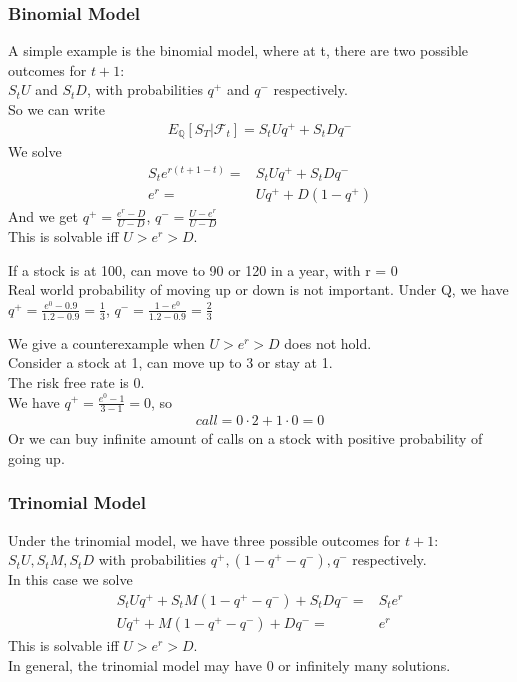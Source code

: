 \subsubsection{Binomial Model}
A simple example is the binomial model, where at t, there are two possible outcomes for $t+1$:\\
$S_t U$ and $S_t D$, with probabilities $q^+$ and $q^-$ respectively.\\
So we can write
\begin{align*}
    E_{\mathbb{Q}}[S_T | \mathcal{F}_t] = S_t U q^+ + S_t D q^-
\end{align*}
We solve
\begin{align*}
    S_t e^{r(t+1-t)} =& S_t U q^+ + S_t D q^- \\
    e^{r} =& U q^+ + D (1-q^+) 
\end{align*}
And we get $ q^+ = \frac{e^r - D}{U - D}$, $ q^- = \frac{U - e^r}{U - D}$ \\
This is solvable iff $U > e^r > D$.\\
\begin{example}
    If a stock is at 100, can move to 90 or 120 in a year, with r = 0\\
    Real world probability of moving up or down is not important.
    Under Q, we have $q^+ = \frac{e^0 - 0.9}{1.2 - 0.9} = \frac{1}{3}$, 
    $q^- = \frac{1 - e^0}{1.2 - 0.9} = \frac{2}{3}$
\end{example}

\begin{example}
    We give a counterexample when $U > e^r > D$ does not hold.\\
    Consider a stock at 1, can move up to 3 or stay at 1.\\
    The risk free rate is 0.\\
    We have $q^+ = \frac{e^0 - 1}{3 - 1} = 0$, so 
    \begin{align*}
        call = 0 \cdot 2 + 1 \cdot 0 = 0
    \end{align*}
    Or we can buy infinite amount of calls on a stock with positive 
    probability of going up.
\end{example}

\subsubsection{Trinomial Model}
Under the trinomial model, we have three possible outcomes for $t+1$:\\
$S_t U, S_t M, S_t D$ with probabilities $q^+, (1 - q^+ - q^-), q^-$ respectively.\\
In this case we solve 
\begin{align*}
    S_t U q^+ + S_t M (1 - q^+ - q^-) + S_t D q^- =&  S_t e^{r}\\
    U q^+ + M (1 - q^+ - q^-) + D q^- =& e^{r}
\end{align*}
This is solvable iff $U > e^r > D$.\\
In general, the trinomial model may have 0 or infinitely many solutions.\\

